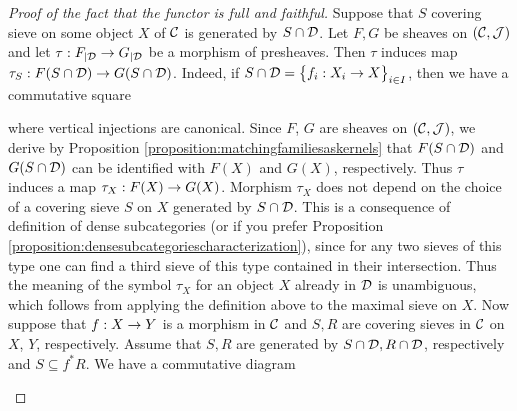 \begin{proof}[Proof of the fact that the functor is full and faithful]
Suppose that $S$ covering sieve on some object $X$ of ${\mathcal C}$ is generated by $S\cap {\mathcal D}$. Let $F, G$ be sheaves on $({\mathcal C},{\mathcal J})$ and let $\tau:F_{\mid {\mathcal D}}\rightarrow G_{\mid {\mathcal D}}$ be a morphism of presheaves. Then $\tau$ induces map $\tau_S:F(S\cap {\mathcal D})\rightarrow G(S\cap {\mathcal D})$. Indeed, if $S\cap {\mathcal D} = \big\{f_i:X_i\rightarrow X\big\}_{i\in I}$, then we have a commutative square
\begin{center}
\end{center}
where vertical injections are canonical. Since $F$, $G$ are sheaves on $({\mathcal C},{\mathcal J})$, we derive by Proposition \ref{proposition:matchingfamiliesaskernels} that $F(S\cap {\mathcal D})$ and $G(S\cap {\mathcal D})$ can be identified with $F(X)$ and $G(X)$, respectively. Thus $\tau$ induces a map $\tau_X:F(X)\rightarrow G(X)$. Morphism $\tau_X$ does not depend on the choice of a covering sieve $S$ on $X$ generated by $S\cap {\mathcal D}$. This is a consequence of definition of dense subcategories (or if you prefer Proposition \ref{proposition:densesubcategoriescharacterization}), since for any two sieves of this type one can find a third sieve of this type contained in their intersection. Thus the meaning of the symbol $\tau_X$ for an object $X$ already in ${\mathcal D}$ is unambiguous, which follows from applying the definition above to the maximal sieve on $X$. Now suppose that $f:X\rightarrow Y$ is a morphism in ${\mathcal C}$ and $S, R$ are covering sieves in ${\mathcal C}$ on $X$, $Y$, respectively. Assume that $S, R$ are generated by $S\cap {\mathcal D}, R\cap {\mathcal D}$, respectively and $S\subseteq f^*R$. We have a commutative diagram
\begin{center}
\end{center}
\end{proof}
